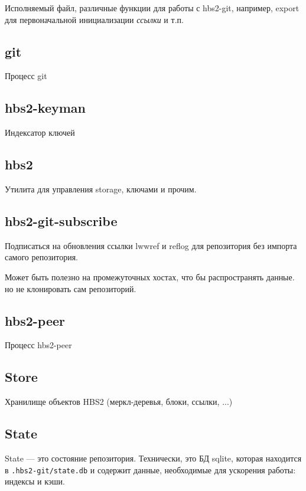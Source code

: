 \documentclass[11pt,a4paper]{article}
\begin{document}
Исполняемый файл, различные функции для работы с hbs2-git, например,
export для первоначальной  инициализации \textit{ссылки} и т.п.

\subsection*{git}

Процесс git

\subsection*{hbs2-keyman}

Индексатор ключей

\subsection*{hbs2}

Утилита для управления storage, ключами и прочим.

\subsection*{hbs2-git-subscribe}

Подписаться на обновления ссылки lwwref и reflog для репозитория
без импорта самого репозитория.

Может быть полезно на промежуточных хостах, что бы распространять
данные. но не клонировать сам репозиторий.

\subsection*{hbs2-peer}

Процесс hbs2-peer

\subsection*{Store}

Хранилище объектов HBS2 (меркл-деревья, блоки, ссылки, ...)

\subsection*{State}

State --- это состояние репозитория. Технически, это БД sqlite,
которая находится в \texttt{.hbs2-git/state.db} и содержит данные,
необходимые для ускорения работы: индексы и кэши.
\end{document}
